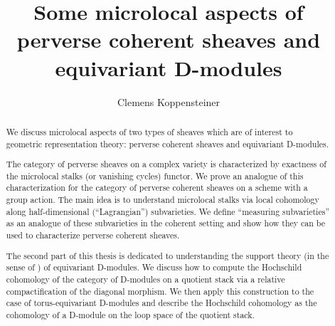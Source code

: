 \documentclass[english]{thesis}
\title{Some microlocal aspects of perverse coherent sheaves and equivariant D-modules}
\author{Clemens Koppensteiner}
\begin{document}
\frontmatter

\maketitlepage

\begin{abstract}
    We discuss microlocal aspects of two types of sheaves which are of interest to geometric representation theory: perverse coherent sheaves and equivariant D-modules.

    The category of perverse sheaves on a complex variety is characterized by exactness of the microlocal stalks (or vanishing cycles) functor.
    We prove an analogue of this characterization for the category of perverse coherent sheaves on a scheme with a group action.
    The main idea is to understand microlocal stalks via local cohomology along half-dimensional (\enquote{Lagrangian}) subvarieties.
    We define \enquote{measuring subvarieties} as an analogue of these subvarieties in the coherent setting and show how they can be used to characterize perverse coherent sheaves.

    The second part of this thesis is dedicated to understanding the support theory (in the sense of \cite{BensonIyengarKrause:2008:LocalCohomologyAndSupportForTriangulatedCategories}) of equivariant D-modules.
    We discuss how to compute the Hochschild cohomology of the category of D-modules on a quotient stack via a relative compactification of the diagonal morphism.
    We then apply this construction to the case of torus-equivariant D-modules and describe the Hochschild cohomology as the cohomology of a D-module on the loop space of the quotient stack.
\end{abstract}



\tableofcontents

\mainmatter





\backmatter

\printbibliography
\end{document}
